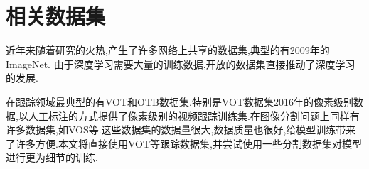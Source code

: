 \section{相关数据集}
近年来随着研究的火热,产生了许多网络上共享的数据集,典型的有2009年的ImageNet\supercite{imagenet_cvpr09}.
由于深度学习需要大量的训练数据,开放的数据集直接推动了深度学习的发展.
\par
在跟踪领域最典型的有VOT\supercite{VOT_TPAMI}和OTB\supercite{WuLimYang13}数据集.特别是VOT数据集2016年的像素级别数据\supercite{Vojir-TR-2017-01},以人工标注的方式提供了像素级别的视频跟踪训练集.在图像分割问题上同样有许多数据集,如VOS\supercite{Cae+17}等.这些数据集的数据量很大,数据质量也很好,给模型训练带来了许多方便.本文将直接使用VOT等跟踪数据集,并尝试使用一些分割数据集对模型进行更为细节的训练.
